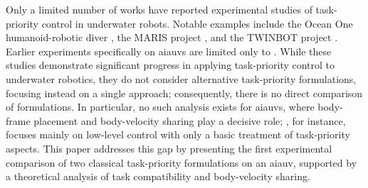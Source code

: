 \documentclass[../main.tex]{subfiles}
\begin{document}


Only a limited number of works have reported experimental studies of task-priority control in underwater robots. Notable examples include the Ocean One humanoid-robotic diver \cite{brantner2021}, the MARIS project \cite{simetti2018}, and the TWINBOT project \cite{Pi2021}. Earlier experiments specifically on \glspl{aiauv} are limited only to \cite{borlaug2022}. While these studies demonstrate significant progress in applying task-priority control to underwater robotics, they do not consider alternative task-priority formulations, focusing instead on a single approach; consequently, there is no direct comparison of formulations. In particular, no such analysis exists for \glspl{aiauv}, where body-frame placement and body-velocity sharing play a decisive role; \cite{borlaug2022}, for instance, focuses mainly on low-level control with only a basic treatment of task-priority aspects. This paper addresses this gap by presenting the first experimental comparison of two classical task-priority formulations on an \gls{aiauv}, supported by a theoretical analysis of task compatibility and body-velocity sharing.



\end{document}
